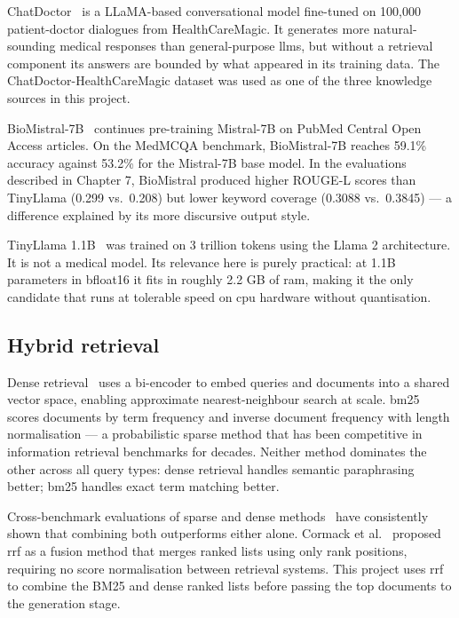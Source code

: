 ChatDoctor~\cite{li2023chatdoctor} is a LLaMA-based conversational model fine-tuned on 100,000 patient-doctor dialogues from HealthCareMagic. It generates more natural-sounding medical responses than general-purpose \ac{llm}s, but without a retrieval component its answers are bounded by what appeared in its training data. The ChatDoctor-HealthCareMagic dataset was used as one of the three knowledge sources in this project.

BioMistral-7B~\cite{labrak2024biomistral} continues pre-training Mistral-7B on PubMed Central Open Access articles. On the MedMCQA benchmark, BioMistral-7B reaches 59.1\% accuracy against 53.2\% for the Mistral-7B base model. In the evaluations described in Chapter 7, BioMistral produced higher ROUGE-L scores than TinyLlama (0.299 vs.\ 0.208) but lower keyword coverage (0.3088 vs.\ 0.3845) --- a difference explained by its more discursive output style.

TinyLlama 1.1B~\cite{zhang2024tinyllama} was trained on 3 trillion tokens using the Llama 2 architecture. It is not a medical model. Its relevance here is purely practical: at 1.1B parameters in bfloat16 it fits in roughly 2.2 GB of \ac{ram}, making it the only candidate that runs at tolerable speed on \ac{cpu} hardware without quantisation.

\subsection{Hybrid retrieval}

Dense retrieval~\cite{karpukhin2020dpr} uses a bi-encoder to embed queries and documents into a shared vector space, enabling approximate nearest-neighbour search at scale. \ac{bm25}~\cite{robertson2009bm25} scores documents by term frequency and inverse document frequency with length normalisation --- a probabilistic sparse method that has been competitive in information retrieval benchmarks for decades. Neither method dominates the other across all query types: dense retrieval handles semantic paraphrasing better; \ac{bm25} handles exact term matching better.

Cross-benchmark evaluations of sparse and dense methods~\cite{ma2022hybrid} have consistently shown that combining both outperforms either alone. Cormack et al.~\cite{cormack2009rrf} proposed \ac{rrf} as a fusion method that merges ranked lists using only rank positions, requiring no score normalisation between retrieval systems. This project uses \ac{rrf} to combine the BM25 and dense ranked lists before passing the top documents to the generation stage.


